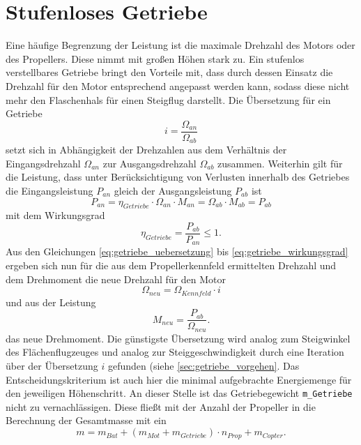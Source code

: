 \section{Stufenloses Getriebe}
\label{sec:getriebe}
Eine häufige Begrenzung der Leistung ist die maximale Drehzahl des Motors oder des Propellers. Diese nimmt mit großen Höhen stark zu. Ein stufenlos verstellbares Getriebe bringt den Vorteile mit, dass durch dessen Einsatz die Drehzahl für den Motor entsprechend angepasst werden kann, sodass diese nicht mehr den Flaschenhals für einen Steigflug darstellt.
Die Übersetzung für ein Getriebe 
\begin{equation}
	i = \frac{\Omega_{an}}{\Omega_{ab}} 
	\label{eq:getriebe_uebersetzung}
\end{equation}
setzt sich in Abhängigkeit der Drehzahlen aus dem Verhältnis der Eingangsdrehzahl \ensuremath{\Omega_{an}} zur Ausgangsdrehzahl \ensuremath{\Omega_{ab}} zusammen. Weiterhin gilt für die Leistung, dass unter Berücksichtigung von Verlusten innerhalb des Getriebes die Eingangsleistung \ensuremath{P_{an}} gleich der Ausgangsleistung \ensuremath{P_{ab}} ist
\begin{equation}
	P_{an} = \eta_{Getriebe} \cdot \Omega_{an}\cdot M_{an} = \Omega_{ab}\cdot M_{ab} = P_{ab}
	\label{eq:getriebe_leistung}
\end{equation} 
mit dem Wirkungsgrad 
\begin{equation}
	\eta_{Getriebe} = \frac{P_{ab}}{P_{an}} \leq 1.
	\label{eq:getriebe_wirkungsgrad}
\end{equation}
Aus den Gleichungen \ref{eq:getriebe_uebersetzung} bis \ref{eq:getriebe_wirkungsgrad} ergeben sich nun für die aus dem Propellerkennfeld ermittelten Drehzahl und dem Drehmoment die neue Drehzahl für den Motor
\begin{equation}
	\Omega_{neu} = \Omega_{Kennfeld}\cdot i
\end{equation}
und aus der Leistung
\begin{equation}
	M_{neu} = \frac{P_{ab}}{\Omega_{neu}}.
\end{equation}
das neue Drehmoment.
Die günstigste Übersetzung wird analog zum Steigwinkel des Flächenflugzeuges und analog zur Steiggeschwindigkeit durch eine Iteration über der Übersetzung \ensuremath{i} gefunden (siehe \ref{sec:getriebe_vorgehen}. Das Entscheidungskriterium ist auch hier die minimal aufgebrachte Energiemenge für den jeweiligen Höhenschritt. An dieser Stelle ist das Getriebegewicht \texttt{m\_Getriebe} nicht zu vernachlässigen. Diese fließt mit der Anzahl der Propeller in die Berechnung der Gesamtmasse mit ein
\begin{equation}
	m = m_{Bat} + (m_{Mot} + m_{Getriebe})\cdot n_{Prop} + m_{Copter} .
\end{equation}


